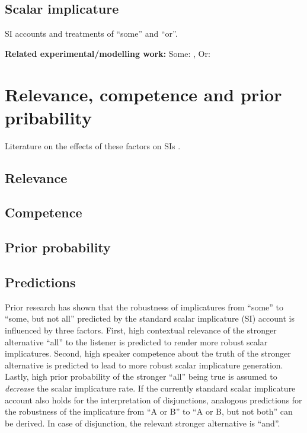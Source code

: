 \documentclass{sp}
\begin{document}
\subsection{Scalar implicature}

SI accounts and treatments of ``some'' and ``or''.

\textbf{Related experimental/modelling work: } 
Some: \citep{degen2015investigating}, 
Or: \citep{Li2021}

\section{Relevance, competence and prior pribability}
Literature on the effects of these factors on SIs \citep{sperber1986relevance, goodman2013knowledge, degen2015wonky}. 
\subsection{Relevance}

\subsection{Competence}

\subsection{Prior probability}

\subsection{Predictions}
Prior research has shown that the robustness of implicatures from ``some'' to ``some, but not all''  predicted by the standard scalar implicature (SI) account is influenced by three factors. First, high contextual relevance of the stronger alternative ``all'' to the listener is predicted to render more robust scalar implicatures. Second, high speaker competence about the truth of the stronger alternative is predicted to lead to more robust scalar implicature generation. Lastly, high prior probability of the stronger ``all'' being true is assumed to \textit{decrease} the scalar implicature rate.
If the currently standard scalar implicature account also holds for the interpretation of disjunctions, analogous predictions for the robustness of the implicature from ``A or B'' to ``A or B, but not both'' can be derived. In case of disjunction, the relevant stronger alternative is ``and''. 
\end{document}

